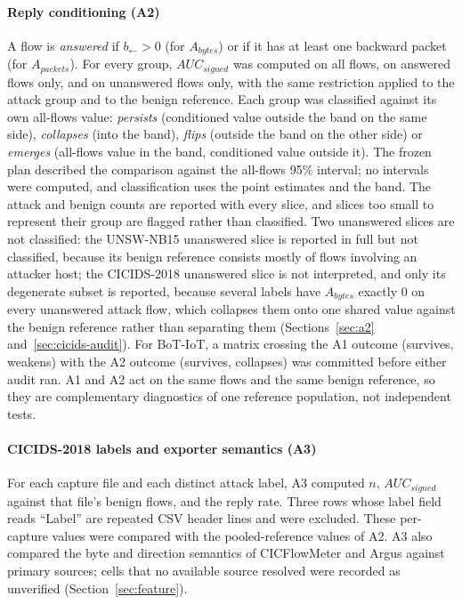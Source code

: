 \documentclass[preprint,12pt]{elsarticle}
\begin{document}
\paragraph{Reply conditioning (A2)} A flow is \emph{answered} if $b_{\leftarrow}>0$ (for $A_{bytes}$) or if it has at least one backward packet (for $A_{packets}$). For every group, $AUC_{signed}$ was computed on all flows, on answered flows only, and on unanswered flows only, with the same restriction applied to the attack group and to the benign reference. Each group was classified against its own all-flows value: \emph{persists} (conditioned value outside the band on the same side), \emph{collapses} (into the band), \emph{flips} (outside the band on the other side) or \emph{emerges} (all-flows value in the band, conditioned value outside it). The frozen plan described the comparison against the all-flows 95\% interval; no intervals were computed, and classification uses the point estimates and the band. The attack and benign counts are reported with every slice, and slices too small to represent their group are flagged rather than classified. Two unanswered slices are not classified: the UNSW-NB15 unanswered slice is reported in full but not classified, because its benign reference consists mostly of flows involving an attacker host; the CICIDS-2018 unanswered slice is not interpreted, and only its degenerate subset is reported, because several labels have $A_{bytes}$ exactly 0 on every unanswered attack flow, which collapses them onto one shared value against the benign reference rather than separating them (Sections~\ref{sec:a2} and~\ref{sec:cicids-audit}). For BoT-IoT, a matrix crossing the A1 outcome (survives, weakens) with the A2 outcome (survives, collapses) was committed before either audit ran. A1 and A2 act on the same flows and the same benign reference, so they are complementary diagnostics of one reference population, not independent tests.

\paragraph{CICIDS-2018 labels and exporter semantics (A3)} For each capture file and each distinct attack label, A3 computed $n$, $AUC_{signed}$ against that file's benign flows, and the reply rate. Three rows whose label field reads ``Label'' are repeated CSV header lines and were excluded. These per-capture values were compared with the pooled-reference values of A2. A3 also compared the byte and direction semantics of CICFlowMeter and Argus against primary sources; cells that no available source resolved were recorded as unverified (Section~\ref{sec:feature}).
\end{document}

